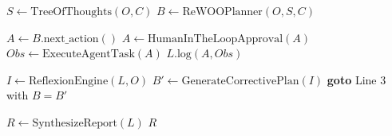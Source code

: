 
\begin{algorithm}
\caption{Composite Reasoning Orchestration}
\label{alg:composite-reasoning}
\begin{algorithmic}[1]

\State $S \gets \text{TreeOfThoughts}(O, C)$ 
\State $B \gets \text{ReWOOPlanner}(O, S, C)$ 

    \State $A \gets B.\text{next\_action}()$
        \State $A \gets \text{HumanInTheLoopApproval}(A)$ 
    \EndIf
    \State $Obs \gets \text{ExecuteAgentTask}(A)$ 
    \State $L.\text{log}(A, Obs)$
\EndWhile

\State $I \gets \text{ReflexionEngine}(L, O)$ 
    \State $B' \gets \text{GenerateCorrectivePlan}(I)$
    \State \textbf{goto} Line 3 with $B = B'$ 
\EndIf

\State $R \gets \text{SynthesizeReport}(L)$
\State \Return $R$
\end{algorithmic}
\end{algorithm}
